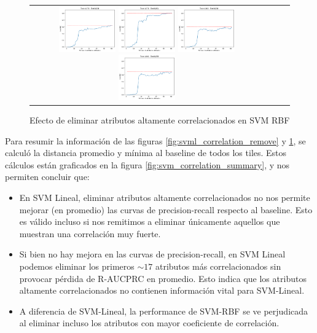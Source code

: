 \begin{figure}[h!]
\begin{tabular}{cccc}
\includegraphics[width=0.25\textwidth]{Kap6/pearson_rbf_INDIVIDUAL_CURVES_train=b278test=b234}  \includegraphics[width=0.25\textwidth]{Kap6/pearson_rbf_INDIVIDUAL_CURVES_train=b278test=b261} 
 \includegraphics[width=0.25\textwidth]{Kap6/pearson_rbf_INDIVIDUAL_CURVES_train=b360test=b234}  \includegraphics[width=0.25\textwidth]{Kap6/pearson_rbf_INDIVIDUAL_CURVES_train=b360test=b278} 
\end{tabular}
\caption{Efecto de eliminar atributos altamente correlacionados en SVM RBF}
\label{fig:svmk_correlation_remove}
\end{figure}

Para resumir la información de las figuras \ref{fig:svml_correlation_remove} y \ref{fig:svmk_correlation_remove}, se calculó la distancia promedio y mínima al baseline de todos los tiles. Estos cálculos están graficados en la figura \ref{fig:svm_correlation_summary}, y nos permiten concluir que:

\begin{itemize}
\item  En SVM Lineal, eliminar atributos altamente correlacionados no nos permite mejorar (en promedio) las curvas de precision-recall respecto al baseline. Esto es válido incluso si nos remitimos a eliminar únicamente aquellos que muestran una correlación muy fuerte.
\item Si bien no hay mejora en las curvas de precision-recall, en SVM Lineal podemos eliminar los primeros $\sim17$ atributos más correlacionados sin provocar pérdida de R-AUCPRC en promedio. Esto indica que los atributos altamente correlacionados no contienen información vital para SVM-Lineal.
\item A diferencia de SVM-Lineal, la performance de SVM-RBF se ve perjudicada al eliminar incluso los atributos con mayor coeficiente de correlación. 
\end{itemize}

